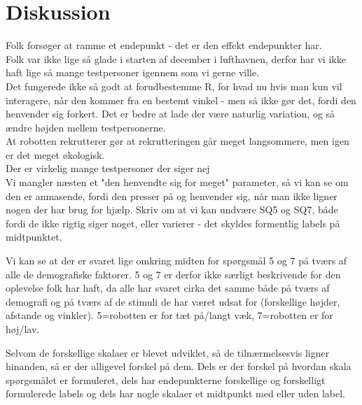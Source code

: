 \chapter{Diskussion}
\label{TestAfSkalaDiskussion}
Folk forsøger at ramme et endepunkt - det er den effekt endepunkter har.\\
Folk var ikke lige så glade i starten af december i lufthavnen, derfor har vi ikke haft lige så mange testpersoner igennem som vi gerne ville.\\
Det fungerede ikke så godt at forudbestemme R, for hvad nu hvis man kun vil interagere, når den kommer fra en bestemt vinkel - men så ikke gør det, fordi den henvender sig forkert. Det er bedre at lade der være naturlig variation, og så ændre højden mellem testpersonerne.\\
At robotten rekrutterer gør at rekrutteringen går meget langsommere, men igen er det meget økologisk.\\
Der er virkelig mange testpersoner der siger nej\\
Vi mangler næsten et "den henvendte sig for meget" parameter, så vi kan se om den er anmasende, fordi den presser på og henvender sig, når man ikke ligner nogen der har brug for hjælp.\blankline
%
Skriv om at vi kan undvære SQ5 og SQ7, både fordi de ikke rigtig siger noget, eller varierer - det skyldes formentlig labels på midtpunktet. 

Vi kan se at der er svaret lige omkring midten for spørgsmål 5 og 7 på tværs af alle de demografiske faktorer. 5 og 7 er derfor ikke særligt beskrivende for den oplevelse folk har haft, da alle har svaret cirka det samme både på tværs af demografi og på tværs af de stimuli de har været udsat for (forskellige højder, afstande og vinkler). 5=robotten er for tæt på/langt væk, 7=robotten er for høj/lav.

Selvom de forskellige skalaer er blevet udviklet, så de tilnærmelsesvis ligner hinanden, så er der alligevel forskel på dem. Dels er der forskel på hvordan skala spørgsmålet er formuleret, dels har endepunkterne forskellige og forskelligt formulerede labels og dels har nogle skalaer et midtpunkt med eller uden label.